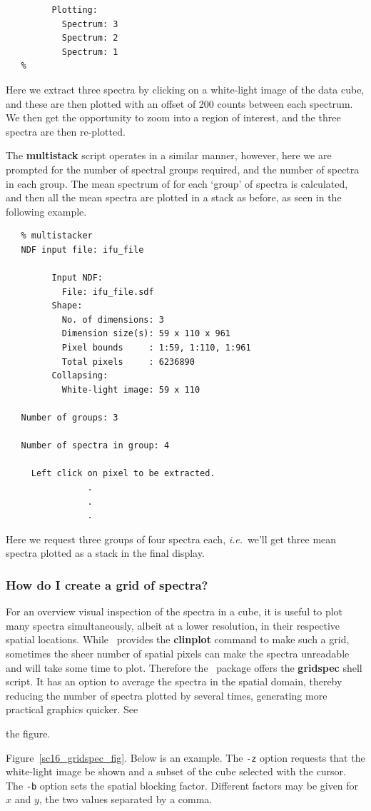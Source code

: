 \documentclass[twoside,11pt]{article}
\newcommand{\xref}[3]{#1}
\newcommand{\xlabel}[1]{}
\newcommand{\latex}[1]{#1}
\begin{document}
{\begin{verbatim}
         Plotting:
           Spectrum: 3
           Spectrum: 2
           Spectrum: 1
   %
\end{verbatim}\normalsize

Here we extract three spectra by clicking on a white-light image of
the data cube, and these are then plotted with an offset of 200 counts
between each spectrum.  We then get the opportunity to zoom into a
region of interest, and the three spectra are then re-plotted.

The {\bf multistack} script operates in a similar manner, however, here
we are prompted for the number of spectral groups required, and the
number of spectra in each group.  The mean spectrum of for each
`group' of spectra is calculated, and then all the mean spectra are
plotted in a stack as before, as seen in the following example. 

\small\begin{verbatim}
   % multistacker
   NDF input file: ifu_file
 
         Input NDF:
           File: ifu_file.sdf
         Shape:
           No. of dimensions: 3
           Dimension size(s): 59 x 110 x 961
           Pixel bounds     : 1:59, 1:110, 1:961
           Total pixels     : 6236890
         Collapsing:
           White-light image: 59 x 110
  
   Number of groups: 3
 
   Number of spectra in group: 4
  
     Left click on pixel to be extracted.
                .
                .
                .	     
\end{verbatim}\normalsize

Here we request three groups of four spectra each, \emph{i.e.}\ we'll
get three mean spectra plotted as a stack in the final display.

\subsubsection{\label{sc16_gridmap}How do I create a grid of
spectra?\xlabel{sc16_gridmap}}

For an overview visual inspection of the spectra in a cube, it is useful
to plot many spectra simultaneously, albeit at a lower resolution, in
their respective spatial locations.  While \KAPPA\ provides the
\xref{{\bf clinplot}}{sun95}{CLINPLOT} command to make such a grid, sometimes
the sheer number of spatial pixels can make the spectra unreadable and
will take some time to plot.  Therefore the \DATACUBE\ package
offers the \xref{{\bf gridspec}}{sun237}{gridspec} shell script.  It
has an option to average the spectra in the spatial domain, thereby
reducing the number of spectra plotted by several times, generating
more practical graphics quicker.   See
\begin{htmlonly}
the figure.
\end{htmlonly}
\latex{Figure~\ref{sc16_gridspec_fig}.}  Below is an
example.  The {\tt -z} option requests that the white-light image be
shown and a subset of the cube selected with the cursor. The {\tt -b}
option sets the spatial blocking factor.  Different factors may be
given for $x$ and $y$, the two values separated by a comma.

}
\end{document}
